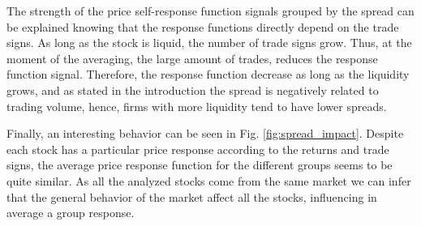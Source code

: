 The strength of the price self-response function signals grouped by the spread
can be explained knowing that the response functions directly depend on the
trade signs. As long as the stock is liquid, the number of trade signs grow.
Thus, at the moment of the averaging, the large amount of trades, reduces the
response function signal. Therefore, the response function decrease as long as
the liquidity grows, and as stated in the introduction the spread is negatively
related to trading volume, hence, firms with more liquidity tend to have lower
spreads.

Finally, an interesting behavior can be seen in Fig. \ref{fig:spread_impact}.
Despite each stock has a particular price response according to the returns and
trade signs, the average price response function for the different groups
seems to be quite similar. As all the analyzed stocks come from the same market
we can infer that the general behavior of the market affect all the stocks,
influencing in average a group response.